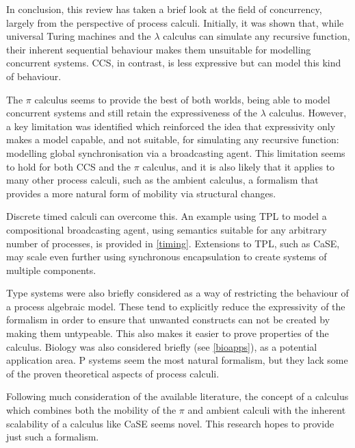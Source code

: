 In conclusion, this review has taken a brief look at the field of
concurrency, largely from the perspective of process calculi.
Initially, it was shown that, while universal Turing machines and the
$\lambda$ calculus can simulate any recursive function, their inherent
sequential behaviour makes them unsuitable for modelling concurrent
systems.  CCS, in contrast, is less expressive but can model this kind
of behaviour.

The $\pi$ calculus seems to provide the best of both worlds, being able
to model concurrent systems and still retain the expressiveness of the
$\lambda$ calculus.  However, a key limitation was identified which
reinforced the idea that expressivity only makes a model capable, and
not suitable, for simulating any recursive function: modelling global
synchronisation via a broadcasting agent.  This limitation seems to hold
for both CCS and the $\pi$ calculus, and it is also likely that it
applies to many other process calculi, such as the ambient calculus, a
formalism that provides a more natural form of mobility via structural
changes.

Discrete timed calculi can overcome this.  An example using TPL to
model a compositional broadcasting agent, using semantics suitable for
any arbitrary number of processes, is provided in \ref{timing}.
Extensions to TPL, such as CaSE, may scale even further using
synchronous encapsulation to create systems of multiple components.

Type systems were also briefly considered as a way of restricting the
behaviour of a process algebraic model.  These tend to explicitly reduce
the expressivity of the formalism in order to ensure that unwanted
constructs can not be created by making them untypeable.  This also
makes it easier to prove properties of the calculus.  Biology was also
considered briefly (see \ref{bioapps}), as a potential application area.
P systems seem the most natural formalism, but they lack some of the
proven theoretical aspects of process calculi.

Following much consideration of the available literature, the concept of
a calculus which combines both the mobility of the $\pi$ and ambient
calculi with the inherent scalability of a calculus like CaSE seems
novel.  This research hopes to provide just such a formalism.



